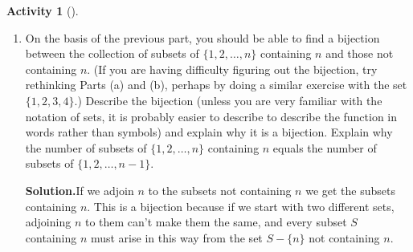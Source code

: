 \documentclass[10pt,]{book}
\theoremstyle{plain}
\theoremstyle{definition}
\newtheorem{activity}[project]{Activity}
\numberwithin{equation}{chapter}
\begin{document}
\begin{activity}[]
\begin{enumerate}[label=(\alph*)]
~\par
\item On the basis of the previous part, you should be able to find a bijection between the collection of subsets of \(\{1, 2, \ldots , n \}\) containing \(n\) and those not containing \(n\). (If you are having difficulty figuring out the bijection, try rethinking Parts (a) and (b), perhaps by doing a similar exercise with the set \(\{1,2,3,4\}\).) Describe the bijection (unless you are very familiar with the notation of sets, it is probably easier to describe to describe the function in words rather than symbols) and explain why it is a bijection. Explain why the number of subsets of \(\{1, 2, \ldots , n \}\) containing \(n\) equals the number of subsets of \(\{1, 2, \ldots, n-1 \}\).%
\par\medskip\noindent%
\textbf{Solution.}\quad If we adjoin \(n\) to the subsets not containing \(n\) we get the subsets containing \(n\). This is a bijection because if we start with two different sets, adjoining \(n\) to them can't make them the same, and every subset \(S\) containing \(n\) must arise in this way from the set \(S-\{n\}\) not containing \(n\).%


\end{enumerate}
\end{activity}
\end{document}
